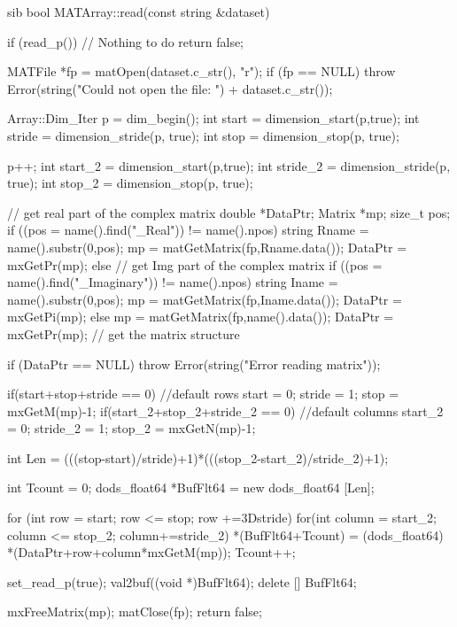\documentclass{dods-paper}
\begin{document}
\begin{vcode}{sib}
bool
MATArray::read(const string &dataset)
{
    if (read_p())  // Nothing to do
        return false;

    MATFile *fp = matOpen(dataset.c_str(), "r");
    if (fp == NULL)
        throw Error(string("Could not open the file: ") + dataset.c_str());
  
    Array::Dim_Iter p = dim_begin();
    int start = dimension_start(p,true);
    int stride = dimension_stride(p, true);
    int stop = dimension_stop(p, true); 

    p++;
    int start_2 = dimension_start(p,true);
    int stride_2 = dimension_stride(p, true);
    int stop_2 = dimension_stop(p, true); 


    // get real part of the complex  matrix
    double *DataPtr;
    Matrix *mp;
    size_t pos;
    if ((pos = name().find("_Real")) != name().npos) {  
        string Rname = name().substr(0,pos);
        mp = matGetMatrix(fp,Rname.data());
        DataPtr = mxGetPr(mp); 
    }
    else{
        // get Img part of the complex matrix
        if ((pos = name().find("_Imaginary")) != name().npos) {  
            string Iname = name().substr(0,pos);
            mp = matGetMatrix(fp,Iname.data());
            DataPtr = mxGetPi(mp); 
        }
        else{
            mp = matGetMatrix(fp,name().data());
            DataPtr = mxGetPr(mp); // get the matrix structure
        }
    }

    if (DataPtr == NULL)
        throw Error(string("Error reading matrix"));

    if(start+stop+stride == 0){ //default rows
        start = 0;
        stride = 1;
        stop = mxGetM(mp)-1;
    }
    if(start_2+stop_2+stride_2 == 0){ //default columns
        start_2 = 0;
        stride_2 = 1;
        stop_2 = mxGetN(mp)-1;
    }

    int Len = (((stop-start)/stride)+1)*(((stop_2-start_2)/stride_2)+1);
  
    int Tcount = 0;
    dods_float64 *BufFlt64 = new dods_float64 [Len];    
  
    for (int row = start; row <= stop; row +=3Dstride) {          
        for(int column = start_2; column <= stop_2; column+=stride_2) {
            *(BufFlt64+Tcount) = (dods_float64)
            *(DataPtr+row+column*mxGetM(mp));  
            Tcount++;
        }
    }

    set_read_p(true);      
    val2buf((void *)BufFlt64);
    delete [] BufFlt64;
          
    mxFreeMatrix(mp);
    matClose(fp);
    return false;
}
\end{vcode}
\end{document}
